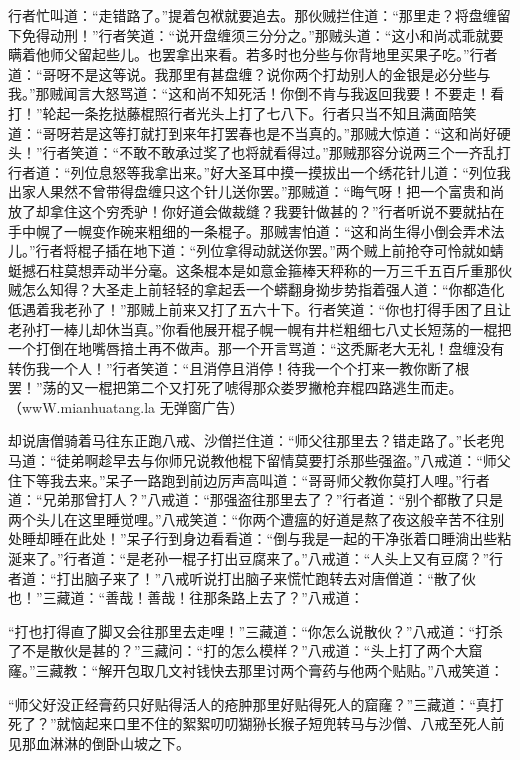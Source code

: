 \documentclass[12pt,UTF8]{ctexbook}
\begin{document}
行者忙叫道：“走错路了。”提着包袱就要追去。那伙贼拦住道：“那里走？将盘缠留下免得动刑！”行者笑道：“说开盘缠须三分分之。”那贼头道：“这小和尚忒乖就要瞒着他师父留起些儿。也罢拿出来看。若多时也分些与你背地里买果子吃。”行者道：“哥呀不是这等说。我那里有甚盘缠？说你两个打劫别人的金银是必分些与我。”那贼闻言大怒骂道：“这和尚不知死活！你倒不肯与我返回我要！不要走！看打！”轮起一条扢挞藤棍照行者光头上打了七八下。行者只当不知且满面陪笑道：“哥呀若是这等打就打到来年打罢春也是不当真的。”那贼大惊道：“这和尚好硬头！”行者笑道：“不敢不敢承过奖了也将就看得过。”那贼那容分说两三个一齐乱打行者道：“列位息怒等我拿出来。”好大圣耳中摸一摸拔出一个绣花针儿道：“列位我出家人果然不曾带得盘缠只这个针儿送你罢。”那贼道：“晦气呀！把一个富贵和尚放了却拿住这个穷秃驴！你好道会做裁缝？我要针做甚的？”行者听说不要就拈在手中幌了一幌变作碗来粗细的一条棍子。那贼害怕道：“这和尚生得小倒会弄术法儿。”行者将棍子插在地下道：“列位拿得动就送你罢。”两个贼上前抢夺可怜就如蜻蜓撼石柱莫想弄动半分毫。这条棍本是如意金箍棒天秤称的一万三千五百斤重那伙贼怎么知得？大圣走上前轻轻的拿起丢一个蟒翻身拗步势指着强人道：“你都造化低遇着我老孙了！”那贼上前来又打了五六十下。行者笑道：“你也打得手困了且让老孙打一棒儿却休当真。”你看他展开棍子幌一幌有井栏粗细七八丈长短荡的一棍把一个打倒在地嘴唇揞土再不做声。那一个开言骂道：“这秃厮老大无礼！盘缠没有转伤我一个人！”行者笑道：“且消停且消停！待我一个个打来一教你断了根罢！”荡的又一棍把第二个又打死了唬得那众娄罗撇枪弃棍四路逃生而走。（wwW.mianhuatang.la 无弹窗广告）

却说唐僧骑着马往东正跑八戒、沙僧拦住道：“师父往那里去？错走路了。”长老兜马道：“徒弟啊趁早去与你师兄说教他棍下留情莫要打杀那些强盗。”八戒道：“师父住下等我去来。”呆子一路跑到前边厉声高叫道：“哥哥师父教你莫打人哩。”行者道：“兄弟那曾打人？”八戒道：“那强盗往那里去了？”行者道：“别个都散了只是两个头儿在这里睡觉哩。”八戒笑道：“你两个遭瘟的好道是熬了夜这般辛苦不往别处睡却睡在此处！”呆子行到身边看看道：“倒与我是一起的干净张着口睡淌出些粘涎来了。”行者道：“是老孙一棍子打出豆腐来了。”八戒道：“人头上又有豆腐？”行者道：“打出脑子来了！”八戒听说打出脑子来慌忙跑转去对唐僧道：“散了伙也！”三藏道：“善哉！善哉！往那条路上去了？”八戒道：

“打也打得直了脚又会往那里去走哩！”三藏道：“你怎么说散伙？”八戒道：“打杀了不是散伙是甚的？”三藏问：“打的怎么模样？”八戒道：“头上打了两个大窟窿。”三藏教：“解开包取几文衬钱快去那里讨两个膏药与他两个贴贴。”八戒笑道：

“师父好没正经膏药只好贴得活人的疮肿那里好贴得死人的窟窿？”三藏道：“真打死了？”就恼起来口里不住的絮絮叨叨猢狲长猴子短兜转马与沙僧、八戒至死人前见那血淋淋的倒卧山坡之下。
\end{document}
